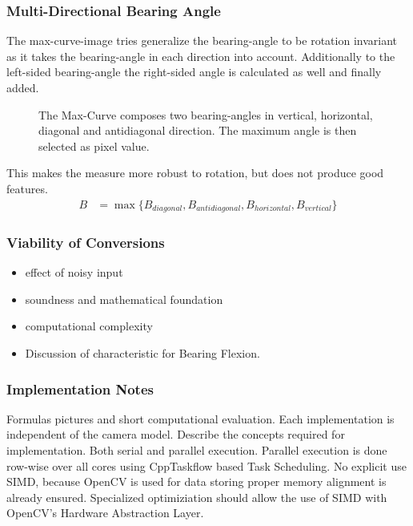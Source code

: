 \subsubsection{Multi-Directional Bearing Angle}

The \gls{max-curve-image} tries generalize the \gls{bearing-angle} to be rotation invariant as it takes the \gls{bearing-angle} in each direction into account.
Additionally to the left-sided \gls{bearing-angle} the right-sided angle is calculated as well and finally added.

\begin{figure}
    
    \caption[Schematic Representation of the Max-Curve]{The Max-Curve composes two \Glspl{bearing-angle} in vertical, horizontal, diagonal and antidiagonal direction. The maximum angle is then selected as pixel value.}
\end{figure}

This makes the measure more robust to rotation, but does not produce good features.
\begin{align}
    B &= \max{\{B_{diagonal}, B_{antidiagonal}, B_{horizontal}, B_{vertical}\}}
\end{align}

\subsubsection{Viability of Conversions}

\begin{itemize}
    \item effect of noisy input
    \item soundness and mathematical foundation
    \item computational complexity
    \item Discussion of characteristic for Bearing Flexion.
\end{itemize}

\subsubsection{Implementation Notes}

Formulas pictures and short computational evaluation.
Each implementation is independent of the camera model.
Describe the concepts required for implementation.
Both serial and parallel execution.
Parallel execution is done row-wise over all cores using CppTaskflow based Task Scheduling.
No explicit use SIMD, because OpenCV\cite{opencv_library} is used for data storing proper memory alignment is already ensured.
Specialized optimiziation should allow the use of SIMD with OpenCV's Hardware Abstraction Layer.

